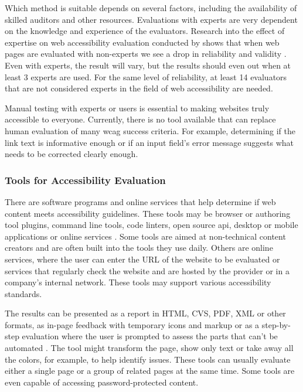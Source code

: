 \documentclass{master_thesis}
\begin{document}
Which method is suitable depends on several factors, including the availability of skilled auditors and other resources. Evaluations with experts are very dependent on the knowledge and experience of the evaluators. Research into the effect of expertise on web accessibility evaluation conducted by \citeauthor{Brajnik2011} shows that when web pages are evaluated with non-experts we see a drop in reliability and validity \citep{Brajnik2011}. Even with experts, the result will vary, but the results should even out when at least 3 experts are used. For the same level of reliability, at least 14 evaluators that are not considered experts in the field of web accessibility are needed.

Manual testing with experts or users is essential to making websites truly accessible to everyone. Currently, there is no tool available that can replace human evaluation of many \ac{wcag} success criteria. For example, determining if the link text is informative enough or if an input field's error message suggests what needs to be corrected clearly enough.

\subsubsection{Tools for Accessibility Evaluation}

There are software programs and online services that help determine if web content meets accessibility guidelines. These tools may be browser or authoring tool plugins, command line tools, code linters, open source \ac{api}, desktop or mobile applications or online services \citep{AbouZahra2017}. Some tools are aimed at non-technical content creators and are often built into the tools they use daily. Others are online services, where the user can enter the URL of the website to be evaluated or services that regularly check the website and are hosted by the provider or in a company's internal network. These tools may support various accessibility standards.

The results can be presented as a report in HTML, CVS, PDF, XML or other formats, as in-page feedback with temporary icons and markup or as a step-by-step evaluation where the user is prompted to assess the parts that can't be automated \citep{AbouZahra2017}. The tool might transform the page, show only text or take away all the colors, for example, to help identify issues. These tools can usually evaluate either a single page or a group of related pages at the same time. Some tools are even capable of accessing password-protected content.
\end{document}
